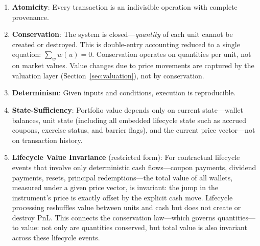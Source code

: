 \documentclass[11pt,a4paper]{article}
\begin{document}
\begin{enumerate}
\item \textbf{Atomicity}: Every transaction is an indivisible operation with complete provenance.
\item \textbf{Conservation}: The system is closed---\emph{quantity} of each unit cannot be created or destroyed. This is double-entry accounting reduced to a single equation: $\sum_w w(u) = 0$. Conservation operates on quantities per unit, not on market values. Value changes due to price movements are captured by the valuation layer (Section~\ref{sec:valuation}), not by conservation.
\item \textbf{Determinism}: Given inputs and conditions, execution is reproducible.
\item \textbf{State-Sufficiency}: Portfolio value depends only on current state---wallet balances, unit state (including all embedded lifecycle state such as accrued coupons, exercise status, and barrier flags), and the current price vector---not on transaction history.
\item \textbf{Lifecycle Value Invariance} (restricted form): For contractual lifecycle events that involve only deterministic cash flows---coupon payments, dividend payments, resets, principal redemptions---the total value of all wallets, measured under a given price vector, is invariant: the jump in the instrument's price is exactly offset by the explicit cash move. Lifecycle processing reshuffles value between units and cash but does not create or destroy PnL. This connects the conservation law---which governs quantities---to value: not only are quantities conserved, but total value is also invariant across these lifecycle events.


\end{enumerate}
\end{document}
